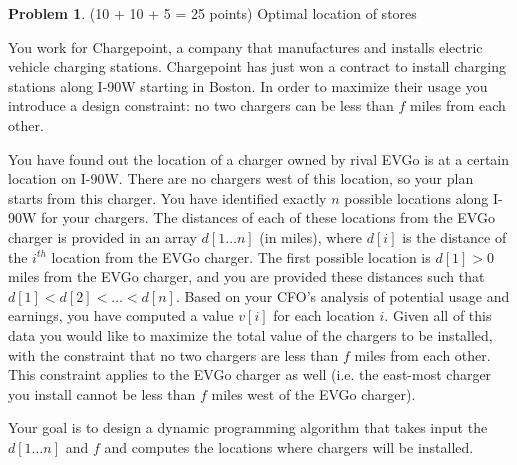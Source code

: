 \documentclass[11pt]{article}
\theoremstyle{definition}
\theoremstyle{theorem}
\newtheorem{prob}{Problem}
\begin{document}
\begin{prob}
(10 + 10 + 5 = 25 points) Optimal location of stores
\end{prob}

You work for Chargepoint, a company that manufactures and installs electric vehicle charging stations. Chargepoint has just won a contract to install charging stations along I-90W starting in Boston. In order to maximize their usage you introduce a design constraint: no two chargers can be less than $f$ miles from each other. 

You have found out the location of a charger owned by rival EVGo is at a certain location on I-90W. There are no chargers west of this location, so your plan starts from this charger. You have identified exactly $n$ possible locations along I-90W for your chargers. The distances of each of these locations from the EVGo charger is provided in an array $d[1\ldots n]$ (in miles), where $d[i]$ is the distance of the $i^{th}$ location from the EVGo charger. The first possible location is $d[1]>0$ miles from the EVGo charger, and you are provided these distances such that $d[1]<d[2]<\ldots <d[n]$. Based on your CFO's analysis of potential usage and earnings, you have computed a value $v[i]$ for each location $i$. Given all of this data you would like to maximize the total value of the chargers to be installed, with the constraint that no two chargers are less than $f$ miles from each other. This constraint applies to the EVGo charger as well (i.e. the east-most charger you install cannot be less than $f$ miles west of the EVGo charger).

Your goal is to design a dynamic programming algorithm that takes
input the $d[1\ldots n]$ and $f$ and computes the locations where chargers will be installed.
\end{document}
